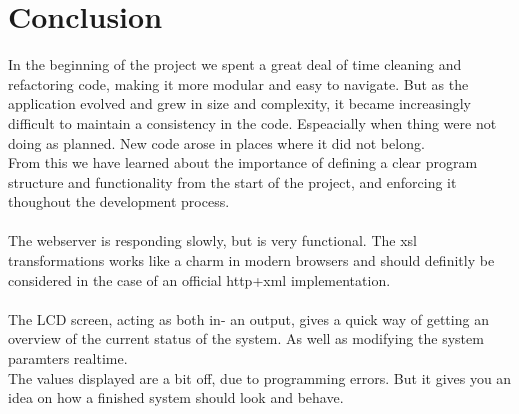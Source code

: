 \chapter{Conclusion}
\label{chap:conclusion}
In the beginning of the project we spent a great deal of time cleaning and refactoring code, making it more modular and easy to navigate. But as the application evolved and grew in size and complexity, it became increasingly difficult to maintain a consistency in the code. Espeacially when thing were not doing as planned. New code arose in places where it did not belong.\\
From this we have learned about the importance of defining a clear program structure and functionality from the start of the project, and enforcing it thoughout the development process.\\\\
The webserver is responding slowly, but is very functional. The xsl transformations works like a charm in modern browsers and should definitly be considered in the case of an official http+xml implementation.\\\\
The LCD screen, acting as both in- an output, gives a quick way of getting an overview of the current status of the system. As well as modifying the system paramters realtime.\\ The values displayed are a bit off, due to programming errors. But it gives you an idea on how a finished system should look and behave.
